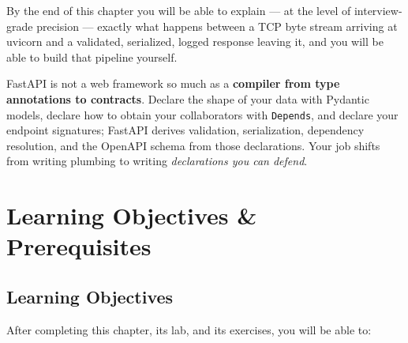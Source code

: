 By the end of this chapter you will be able to explain --- at the level of
interview-grade precision --- exactly what happens between a TCP byte stream
arriving at uvicorn and a validated, serialized, logged response leaving it,
and you will be able to build that pipeline yourself.

\begin{keyconceptbox}
FastAPI is not a web framework so much as a \textbf{compiler from type
annotations to contracts}. Declare the shape of your data with Pydantic
models, declare how to obtain your collaborators with \texttt{Depends}, and
declare your endpoint signatures; FastAPI derives validation, serialization,
dependency resolution, and the OpenAPI schema from those declarations. Your
job shifts from writing plumbing to writing \emph{declarations you can
defend}.
\end{keyconceptbox}

\section{Learning Objectives \& Prerequisites}
\label{sec:ch6-objectives}

\subsection*{Learning Objectives}
After completing this chapter, its lab, and its exercises, you will be able to:

